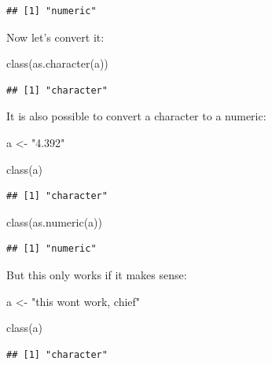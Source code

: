 \documentclass[
]{article}
\newenvironment{Shaded}{\begin{snugshade}}{\end{snugshade}}
\newcommand{\FunctionTok}[1]{\textcolor[rgb]{0.00,0.00,0.00}{#1}}
\newcommand{\NormalTok}[1]{#1}
\newcommand{\OtherTok}[1]{\textcolor[rgb]{0.56,0.35,0.01}{#1}}
\newcommand{\StringTok}[1]{\textcolor[rgb]{0.31,0.60,0.02}{#1}}
\begin{document}
\begin{verbatim}
## [1] "numeric"
\end{verbatim}

Now let's convert it:

\begin{Shaded}
\begin{Highlighting}[]
\FunctionTok{class}\NormalTok{(}\FunctionTok{as.character}\NormalTok{(a))}
\end{Highlighting}
\end{Shaded}

\begin{verbatim}
## [1] "character"
\end{verbatim}

It is also possible to convert a character to a numeric:

\begin{Shaded}
\begin{Highlighting}[]
\NormalTok{a }\OtherTok{\textless{}{-}} \StringTok{"4.392"}

\FunctionTok{class}\NormalTok{(a)}
\end{Highlighting}
\end{Shaded}

\begin{verbatim}
## [1] "character"
\end{verbatim}

\begin{Shaded}
\begin{Highlighting}[]
\FunctionTok{class}\NormalTok{(}\FunctionTok{as.numeric}\NormalTok{(a))}
\end{Highlighting}
\end{Shaded}

\begin{verbatim}
## [1] "numeric"
\end{verbatim}

But this only works if it makes sense:

\begin{Shaded}
\begin{Highlighting}[]
\NormalTok{a }\OtherTok{\textless{}{-}} \StringTok{"this won\textquotesingle{}t work, chief"}

\FunctionTok{class}\NormalTok{(a)}
\end{Highlighting}
\end{Shaded}

\begin{verbatim}
## [1] "character"
\end{verbatim}
\end{document}
